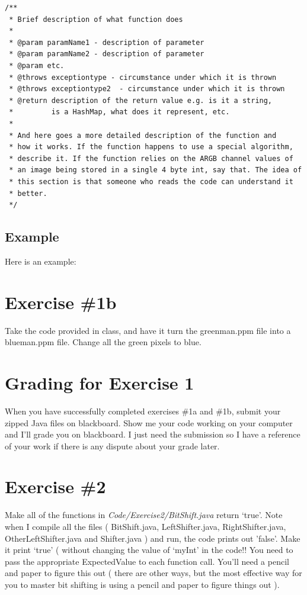 \documentclass[12pt]{article}
\begin{document}
\begin{verbatim}
/**
 * Brief description of what function does
 *
 * @param paramName1 - description of parameter
 * @param paramName2 - description of parameter
 * @param etc.
 * @throws exceptiontype - circumstance under which it is thrown
 * @throws exceptiontype2  - circumstance under which it is thrown
 * @return description of the return value e.g. is it a string, 
 *         is a HashMap, what does it represent, etc.
 *
 * And here goes a more detailed description of the function and
 * how it works. If the function happens to use a special algorithm,
 * describe it. If the function relies on the ARGB channel values of 
 * an image being stored in a single 4 byte int, say that. The idea of 
 * this section is that someone who reads the code can understand it 
 * better.
 */
\end{verbatim}

\subsection{Example}
Here is an example:



\section{Exercise \#1b}

Take the code provided in class, and have it turn the greenman.ppm file into a blueman.ppm file. Change all the green pixels to blue.

\section{Grading for Exercise 1}
When you have successfully completed exercises \#1a and \#1b, submit your zipped Java files on blackboard. Show me your code working on your computer and I'll grade you on blackboard. I just need the submission so I have a reference of your work if there is any dispute about your grade later.

\section{Exercise \#2}

Make all of the functions in \textit{Code/Exercise2/BitShift.java} return `true'. Note when I compile all the files ( BitShift.java, LeftShifter.java, RightShifter.java, OtherLeftShifter.java and Shifter.java ) and run, the code prints out 'false'. Make it print `true' ( without changing the value of `myInt' in the code!! You need to pass the appropriate ExpectedValue to each function call. You'll need a pencil and paper to figure this out ( there are other ways, but the most effective way for you to master bit shifting is using a pencil and paper to figure things out ).
\end{document}
